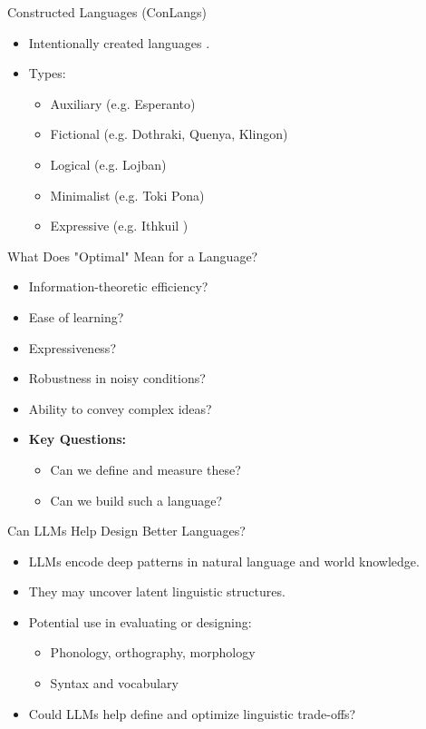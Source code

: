 \documentclass{beamer}
\begin{document}
\begin{frame}{Constructed Languages (ConLangs)}
	\begin{itemize}
		\item Intentionally created languages \cite{schreyerConstructedLanguages2021}.
		\item Types:
		\begin{itemize}
			\item Auxiliary (e.g. Esperanto)
			\item Fictional (e.g. Dothraki, Quenya, Klingon)
			\item Logical (e.g. Lojban)
			\item Minimalist (e.g. Toki Pona)
			\item Expressive (e.g. Ithkuil \cite{Ithkuil2024})
		\end{itemize}
	\end{itemize}
\end{frame}

\begin{frame}{What Does "Optimal" Mean for a Language?}
	\begin{itemize}
		\item Information-theoretic efficiency?
		\item Ease of learning?
		\item Expressiveness?
		\item Robustness in noisy conditions?
		\item Ability to convey complex ideas?
		\item \textbf{Key Questions:}
		\begin{itemize}
			\item Can we define and measure these?
			\item Can we build such a language?
		\end{itemize}
	\end{itemize}
\end{frame}

\begin{frame}{Can LLMs Help Design Better Languages?}
	\begin{itemize}
		\item LLMs encode deep patterns in natural language and world knowledge.
		\item They may uncover latent linguistic structures.
		\item Potential use in evaluating or designing:
		\begin{itemize}
			\item Phonology, orthography, morphology
			\item Syntax and vocabulary
		\end{itemize}
		\item Could LLMs help define and optimize linguistic trade-offs?
	\end{itemize}
\end{frame}
\end{document}
